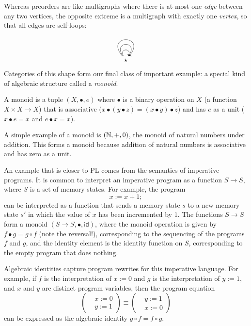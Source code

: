 Whereas preorders are like multigraphs where there is at most one \emph{edge}
between any two vertices,
the opposite extreme is a multigraph with exactly one \emph{vertex},
so that all edges are self-loops:
\begin{equation}
\begin{aligned}
\begin{tikzcd}
	\star
	\arrow[from=1-1, to=1-1, loop, in=55, out=125, distance=10mm]
	\arrow[from=1-1, to=1-1, loop, in=60, out=120, distance=5mm]
	\arrow[from=1-1, to=1-1, loop, in=50, out=130, distance=15mm]
\end{tikzcd}
\end{aligned}
\end{equation}
Categories of this shape form our final class of important example:
a special kind of algebraic structure called a \emph{monoid}.
\begin{definition}[monoid]
  A monoid is a tuple \((X,\bullet,e)\)
  where \(\bullet\) is a binary operation on \(X\)
  (a function \(X \times X \to X\))
  that is associative (\(x\bullet (y\bullet z) = (x\bullet y) \bullet z\))
  and has \(e\) as a unit (\(x\bullet e = x\) and \(e\bullet x = x\)).
\end{definition}
A simple example of a monoid is \((\mathbb N,+,0)\),
the monoid of natural numbers under addition.
This forms a monoid because addition of natural numbers is associative
and has zero as a unit.

An example that is closer to PL
comes from the semantics of imperative programs.
It is common to interpret an imperative program
as a function \(S \to S\), where \(S\) is a set of
memory states.
For example, the program
\[
  x := x + 1;
\]
can be interpreted
as a function that sends a memory state \(s\)
to a new memory state \(s'\) in which
the value of \(x\) has been incremented by \(1\).
The functions \(S \to S\) form a monoid
\((S\to S,\bullet,\mathsf{id})\),
where the monoid operation is given by \(f \bullet g = g \circ f\)
(note the reversal!),
corresponding to the sequencing of the programs \(f\) and \(g\),
and the identity element is the identity function on \(S\),
corresponding to the empty program that does nothing.

Algebraic identities capture program rewrites for this imperative language.
For example, if \(f\) is the interpretation of \(x := 0\)
and \(g\) is the interpretation of \(y := 1\),
and \(x\) and \(y\) are distinct program variables,
then the program equation
\begin{equation}
  \left(\begin{aligned}
    &x := 0 \\
    &y := 1
  \end{aligned}\right)
  \equiv
  \left(\begin{aligned}
    &y := 1 \\
    &x := 0
  \end{aligned}\right)
\end{equation}
can be expressed as the algebraic identity \(g \circ f = f \circ g\).

